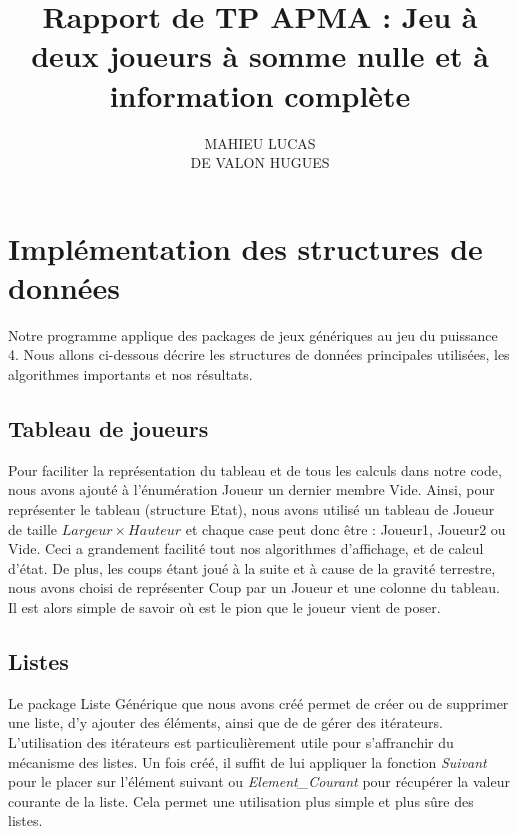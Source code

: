 \documentclass[a4paper, 10pt, french]{article}
\title {Rapport de TP APMA : Jeu à deux joueurs à somme nulle et à information complète}
\author
{
    MAHIEU LUCAS
    \\ DE VALON HUGUES
}
\begin{document}
\maketitle

\section{Implémentation des structures de données}
{

    Notre programme applique des packages de jeux génériques au jeu du puissance 4.
    Nous allons ci-dessous décrire les structures de données principales utilisées, les algorithmes importants et nos résultats.

    \subsection{Tableau de joueurs}
    {
        Pour faciliter la représentation du tableau et de tous les calculs dans notre code, nous avons ajouté à l'énumération
        Joueur un dernier membre Vide. Ainsi, pour représenter le tableau (structure Etat), nous avons utilisé un tableau 
        de Joueur de taille $Largeur  \times Hauteur$ et chaque case peut donc être : Joueur1, Joueur2 ou Vide. 
        Ceci a grandement facilité tout nos algorithmes d'affichage, et de calcul d'état. De plus, les coups étant joué à la suite
        et à cause de la gravité terrestre, nous avons choisi de représenter Coup par un Joueur et une colonne du tableau. Il est
        alors simple de savoir où est le pion que le joueur vient de poser.
    }

    \subsection{Listes}
    {
        Le package Liste Générique que nous avons créé permet de créer ou de supprimer une liste, d'y ajouter des éléments,
        ainsi que de de gérer des itérateurs. L'utilisation des itérateurs est particulièrement utile pour s'affranchir 
        du mécanisme des listes. Un fois créé, il suffit de lui appliquer la fonction {\em Suivant} pour le placer sur 
        l'élément suivant ou {\em Element\_Courant} pour récupérer la valeur courante de la liste. 
        Cela permet une utilisation plus simple et plus sûre des listes.
    }

}
\end{document}
